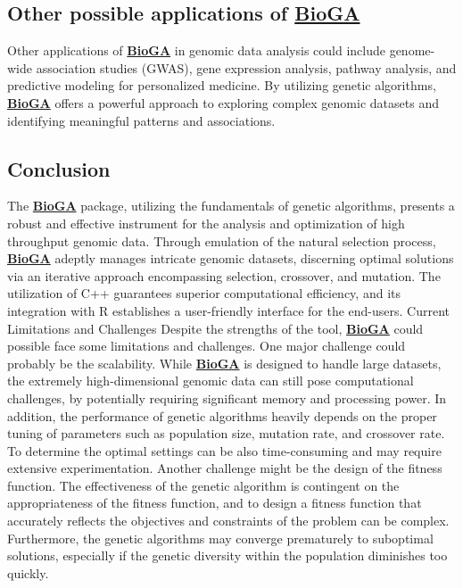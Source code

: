 \documentclass[
]{article}
\begin{document}
\subsection{\texorpdfstring{Other possible applications of
\href{https://doi.org/doi:10.18129/B9.bioc.BioGA}{\textbf{BioGA}}}{Other possible applications of BioGA}}\label{other-possible-applications-of-bioga}

Other applications of
\href{https://doi.org/doi:10.18129/B9.bioc.BioGA}{\textbf{BioGA}} in
genomic data analysis could include genome-wide association studies
(GWAS), gene expression analysis, pathway analysis, and predictive
modeling for personalized medicine. By utilizing genetic algorithms,
\href{https://doi.org/doi:10.18129/B9.bioc.BioGA}{\textbf{BioGA}} offers
a powerful approach to exploring complex genomic datasets and
identifying meaningful patterns and associations.

\subsection{Conclusion}\label{conclusion}

The \href{https://doi.org/doi:10.18129/B9.bioc.BioGA}{\textbf{BioGA}}
package, utilizing the fundamentals of genetic algorithms, presents a
robust and effective instrument for the analysis and optimization of
high throughput genomic data. Through emulation of the natural selection
process,
\href{https://doi.org/doi:10.18129/B9.bioc.BioGA}{\textbf{BioGA}}
adeptly manages intricate genomic datasets, discerning optimal solutions
via an iterative approach encompassing selection, crossover, and
mutation. The utilization of C++ guarantees superior computational
efficiency, and its integration with R establishes a user-friendly
interface for the end-users. Current Limitations and Challenges Despite
the strengths of the tool,
\href{https://doi.org/doi:10.18129/B9.bioc.BioGA}{\textbf{BioGA}} could
possible face some limitations and challenges. One major challenge could
probably be the scalability. While
\href{https://doi.org/doi:10.18129/B9.bioc.BioGA}{\textbf{BioGA}} is
designed to handle large datasets, the extremely high-dimensional
genomic data can still pose computational challenges, by potentially
requiring significant memory and processing power. In addition, the
performance of genetic algorithms heavily depends on the proper tuning
of parameters such as population size, mutation rate, and crossover
rate. To determine the optimal settings can be also time-consuming and
may require extensive experimentation. Another challenge might be the
design of the fitness function. The effectiveness of the genetic
algorithm is contingent on the appropriateness of the fitness function,
and to design a fitness function that accurately reflects the objectives
and constraints of the problem can be complex. Furthermore, the genetic
algorithms may converge prematurely to suboptimal solutions, especially
if the genetic diversity within the population diminishes too quickly.
\end{document}
